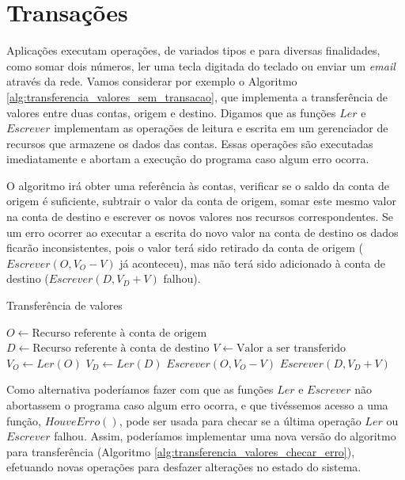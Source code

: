 \documentclass[11pt,twoside,a4paper]{book}
\begin{document}
\section{Transações}
\label{sec:transacoes}
Aplicações executam operações, de variados tipos e para diversas finalidades, como somar dois números, ler uma tecla digitada do teclado ou enviar um \emph{email} através da rede. Vamos considerar por exemplo o Algoritmo \ref{alg:transferencia_valores_sem_transacao}, que implementa a transferência de valores entre duas contas, origem e destino. Digamos que as funções $Ler$ e $Escrever$ implementam as operações de leitura e escrita em um gerenciador de recursos que armazene os dados das contas. Essas operações são executadas imediatamente e abortam a execução do programa caso algum erro ocorra.

O algoritmo irá obter uma referência às contas, verificar se o saldo da conta de origem é suficiente, subtrair o valor da conta de origem, somar este mesmo valor na conta de destino e escrever os novos valores nos recursos correspondentes. Se um erro ocorrer ao executar a escrita do novo valor na conta de destino os dados ficarão inconsistentes, pois o valor terá sido retirado da conta de origem ($Escrever(O, V_O - V)$ já aconteceu), mas não terá sido adicionado à conta de destino ($Escrever(D, V_D + V)$ falhou).

\begin{algorithm}
\caption{Transferência de valores}
\label{alg:transferencia_valores_sem_transacao}
\begin{algorithmic}[1]
\State $O \gets \text{Recurso referente à conta de origem}$
\State $D \gets \text{Recurso referente à conta de destino}$
\State $V \gets \text{Valor a ser transferido}$
\State $V_O \gets Ler(O)$
    \State $V_D \gets Ler(D)$
    \State $Escrever(O, V_O - V)$
    \State $Escrever(D, V_D + V)$
\EndIf
\end{algorithmic}
\end{algorithm}

Como alternativa poderíamos fazer com que as funções $Ler$ e $Escrever$ não abortassem o programa caso algum erro ocorra, e que tivéssemos acesso a uma função, $HouveErro()$, pode ser usada para checar se a última operação $Ler$ ou $Escrever$ falhou. Assim, poderíamos implementar uma nova versão do algoritmo para transferência (Algoritmo \ref{alg:transferencia_valores_checar_erro}), efetuando novas operações para desfazer alterações no estado do sistema.
\end{document}
